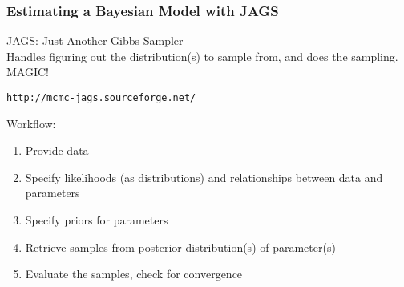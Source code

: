 \documentclass{beamer}
\begin{document}

\begin{frame}[fragile]
\frametitle{Estimating a Bayesian Model with JAGS}

JAGS: Just Another Gibbs Sampler\\
Handles figuring out the distribution(s) to sample from, and does the sampling. MAGIC!\\
\begin{verbatim}
http://mcmc-jags.sourceforge.net/
\end{verbatim}

\medskip
Workflow:
\begin{enumerate}
\item Provide data
\item Specify likelihoods (as distributions) and relationships between data and parameters
\item Specify priors for parameters
\item Retrieve samples from posterior distribution(s) of parameter(s) 
\item Evaluate the samples, check for convergence
\end{enumerate}
\end{frame}





\end{document}
